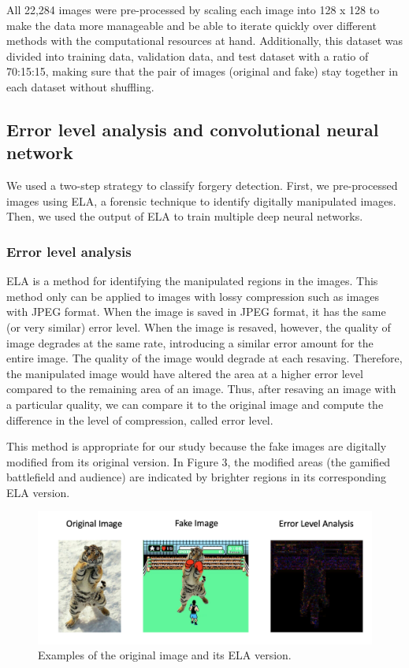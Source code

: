 \documentclass[11pt]{article}
\begin{document}
All 22,284 images were pre-processed by scaling each image into 128 x 128 to make the data more manageable and be able to iterate quickly over different methods with the computational resources at hand. Additionally, this dataset was divided into training data, validation data, and test dataset with a ratio of 70:15:15, making sure that the pair of images (original and fake) stay together in each dataset without shuffling.


\subsection{Error level analysis and convolutional neural network}

We used a two-step strategy to classify forgery detection. First, we pre-processed images using ELA,  a forensic technique to identify digitally manipulated images. Then, we used the output of ELA to train multiple deep neural networks.

\subsubsection{Error level analysis}

ELA is a method for identifying the manipulated regions in the images. This method only can be applied to images with lossy compression such as images with JPEG format. When the image is saved in JPEG format, it has the same (or very similar) error level. When the image is resaved, however, the quality of image degrades at the same rate, introducing a similar error amount for the entire image. The quality of the image would degrade at each resaving. Therefore, the manipulated image would have altered the area at a higher error level compared to the remaining area of an image. Thus, after resaving an image with a particular quality, we can compare it to the original image and compute the difference in the level of compression, called error level.

This method is appropriate for our study because the fake images are digitally modified from its original version. In Figure 3, the modified areas (the gamified battlefield and audience) are indicated by brighter regions in its corresponding ELA version.

\begin{figure}[!htb]
    \centering
        \includegraphics[scale=.62]{figures/figure_3.png}
    \caption{Examples of the original image and its ELA version.}
    \label{fig:3}
\end{figure}
\end{document}
